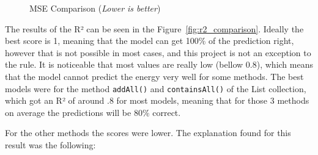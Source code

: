 \begin{figure}[htbp]
  \centering
  \caption{MSE Comparison (\textit{Lower is better})}
  \label{fig:mse_comparison}
\end{figure}

The results of the R² can be seen in the Figure~\ref{fig:r2_comparison}.
Ideally the best score is 1, meaning that the model can get 100\% of the prediction right, however that is not possible in most cases, and this project is not an exception to the rule. It is noticeable that most values are really low (bellow 0.8), which means that the model cannot predict the energy very well for some methods. The best models were for the method \texttt{addAll()} and \texttt{containsAll()} of the List collection, which got an R² of around .8 for most models, meaning that for those 3 methods on average the predictions will be 80\% correct.

For the other methods the scores were lower. The explanation found for this result was the following:


